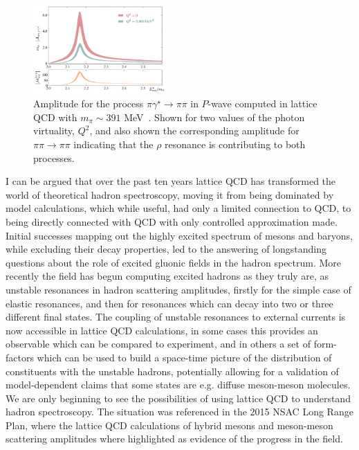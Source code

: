 \begin{figure}
\includegraphics[width=0.45\textwidth]{figures/rho_pi_gamma}
\caption{Amplitude for the process ${\pi \gamma^\star \to \pi\pi}$ in $P$-wave computed in lattice QCD with $m_\pi \sim 391$ MeV~\cite{Briceno:2016kkp,Briceno:2015dca}. Shown for two values of the photon virtuality, $Q^2$, and also shown the corresponding amplitude for $\pi\pi \to \pi \pi$ indicating that the $\rho$ resonance is contributing to both processes.  }
\label{rhopigamma}
\end{figure}

\vspace{5mm}
I can be argued that over the past ten years lattice QCD has transformed the world of theoretical hadron spectroscopy, moving it from being dominated by model calculations, which while useful, had only a limited connection to QCD, to being directly connected with QCD with only controlled approximation made. Initial successes mapping out the highly excited spectrum of mesons and baryons, while excluding their decay properties, led to the answering of longstanding questions about the role of excited gluonic fields in the hadron spectrum. More recently the field has begun computing excited hadrons as they truly are, as unstable resonances in hadron scattering amplitudes, firstly for the simple case of elastic resonances, and then for resonances which can decay into two or three different final states. The coupling of unstable resonances to external currents is now accessible in lattice QCD calculations, in some cases this provides an observable which can be compared to experiment, and in others a set of form-factors which can be used to build a space-time picture of the distribution of constituents with the unstable hadrons, potentially allowing for a validation of model-dependent claims that some states are e.g. diffuse meson-meson molecules. We are only beginning to see the possibilities of using lattice QCD to understand hadron spectroscopy. The situation was referenced in the 2015 NSAC Long Range Plan, where the lattice QCD calculations of hybrid mesons and meson-meson scattering amplitudes where highlighted as evidence of the progress in the field.

